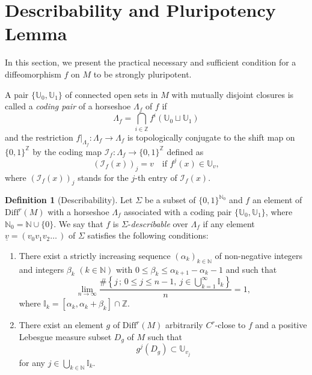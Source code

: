 \documentclass{amsart}
\theoremstyle{plain}
\theoremstyle{definition}
\newtheorem{dfn}[thm]{Definition}
\theoremstyle{remark}
\numberwithin{equation}{section}
\begin{document}
\section{Describability and Pluripotency Lemma}\label{S_describable}

In this section, we present the practical necessary and sufficient condition for a diffeomorphism $f$ on 
$M$ to be strongly pluripotent.

A pair $\{\mathbb{U}_0,\mathbb{U}_1\}$ of connected open sets in $M$ with mutually disjoint closures 
 is called a  \emph{coding pair} of a horseshoe $\Lambda_f$ of $f$ if 
\[
\Lambda_f =\bigcap_{i\in \mathbb{Z}} f^{i}(\mathbb U_0 \sqcup \mathbb U_1)
\]
and the restriction $f|_{\Lambda_f}:\Lambda_f\longrightarrow \Lambda_f$ is topologically conjugate 
to the shift map on $ \{ 0,1\} ^{\mathbb Z}$ by the coding map  
$\mathcal{I}_f: \Lambda_f  \longrightarrow  \{ 0,1\} ^{\mathbb Z}$ defined as 
\[
\left(\mathcal{I}_f(x) \right)_j = v \quad \text{if $f^j(x) \in \mathbb U_{v}$}, 
\]
where $(\mathcal{I}_f(x) )_j$ stands for the $j$-th entry of $\mathcal{I}_f(x)$. 




\begin{dfn}[Describability]\label{describable}
Let $\Sigma$ be a subset of $\{0,1\}^{\mathbb N_0}$ and 
$f$ an element of $\mathrm{Diff}^{r}(M)$ with a horseshoe $\Lambda_f$ associated with a coding pair $\{ \mathbb U_0, \mathbb U_1 \}$, 
where $\mathbb N_0=\mathbb{N}\cup \{0\}$.  
We say that $f$ is $\Sigma$-\emph{describable} over $\Lambda_f$  
if any element $\underline{v}=(v_{0}v_{1}v_{2}\ldots\,)$ of $\Sigma$
satisfies the following conditions: 

\begin{enumerate}[({D}1)]
\makeatletter
\renewcommand{\p@enumi}{D}
\makeatother
\item\label{D1}
There exist a strictly increasing sequence $(\alpha _k)_{k\in \mathbb N}$ of non-negative integers and 
integers $\beta _k$ $(k\in \mathbb N)$ with $0\leq \beta _k\leq \alpha _{k+1}-\alpha _k-1$ and  
such that 
\[
\lim _{n\rightarrow \infty} \frac{\#\left\{j\,;\, 0\le j \le n-1,\ j \in \bigcup _{k=1}^\infty \mathbb{I}_k\right\}}{n} =1, 
\]
where $\mathbb{I}_k
=[\alpha_k, \alpha _k+ \beta_k] \cap \mathbb Z$.
\item\label{D2}
There exist an element $g$ of $\mathrm{Diff}^{r}(M)$ arbitrarily $C^r$-close to $f$ and  
a positive Lebesgue measure subset $D_g$ of $M$  
such that  
\[
g^j (D_g) \subset \mathbb U_{v_{j}}
\]
for any  $j\in \bigcup_{k\in \mathbb{N}
} \mathbb I_k$.  
\end{enumerate}
\end{dfn}
\end{document}
